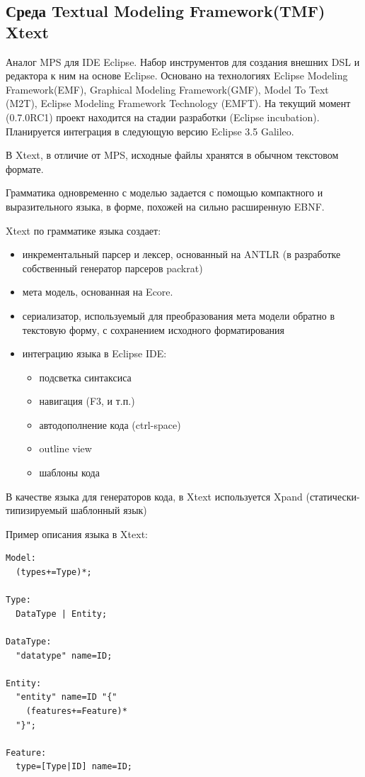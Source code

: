 \documentclass[a4paper,12pt,titlepage]{extarticle}
\begin{document}
\subsection{Среда Textual Modeling Framework(TMF) Xtext}
Аналог MPS для IDE Eclipse.
Набор инструментов для создания внешних DSL и редактора к ним на основе Eclipse.
Основано на технологиях Eclipse Modeling Framework(EMF), Graphical Modeling
Framework(GMF), Model To Text (M2T), Eclipse Modeling Framework Technology
(EMFT). На текущий момент (0.7.0RC1) проект находится на стадии разработки
(Eclipse incubation). Планируется интеграция в следующую версию Eclipse 3.5
Galileo.

В Xtext, в отличие от MPS, исходные файлы хранятся в обычном текстовом формате.

Грамматика одновременно с моделью задается с помощью компактного и
выразительного языка, в форме, похожей на сильно расширенную EBNF.

Xtext по грамматике языка создает:
\begin{itemize}
  \item инкрементальный парсер и лексер, основанный на ANTLR (в разработке
  собственный генератор парсеров packrat)
  \item мета модель, основанная на Ecore.
  \item сериализатор, используемый для преобразования мета модели обратно в
  текстовую форму, с сохранением исходного форматирования 
  \item интеграцию языка в Eclipse IDE:
  \begin{itemize}
    \item подсветка синтаксиса
    \item навигация (F3, и т.п.)
    \item автодополнение кода (ctrl-space)
    \item outline view
    \item шаблоны кода
  \end{itemize}
\end{itemize}

В качестве языка для генераторов кода, в Xtext используется Xpand
(статически-типизируемый шаблонный язык)

Пример описания языка в Xtext:
\begin{verbatim}
Model:
  (types+=Type)*;

Type:
  DataType | Entity;

DataType:
  "datatype" name=ID;

Entity:
  "entity" name=ID "{"
    (features+=Feature)* 
  "}";

Feature:
  type=[Type|ID] name=ID;   
\end{verbatim}
\end{document}
